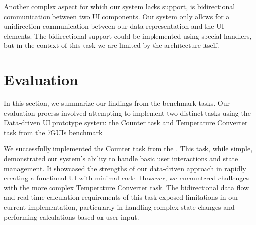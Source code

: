Another complex aspect for which our system lacks support, is bidirectional communication between two UI components.
Our system only allows for a unidirection communication between our data representation and the UI elements.
The bidirectional support could be implemented using special handlers, but in the context of this task we are limited by the architecture itself.


\section{Evaluation}
In this section, we summarize our findings from the benchmark tasks.
Our evaluation process involved attempting to implement two distinct tasks using the Data-driven UI prototype system:
the Counter task and Temperature Converter task from the 7GUIs benchmark

We successfully implemented the Counter task from the \citet{7GUIs-web}.
This task, while simple, demonstrated our system's ability to handle basic user interactions and state management.
It showcased the strengths of our data-driven approach in rapidly creating a functional UI with minimal code.
However, we encountered challenges with the more complex Temperature Converter task.
The bidirectional data flow and real-time calculation requirements of this task exposed
limitations in our current implementation, particularly in handling complex state changes and performing calculations based on user input.


